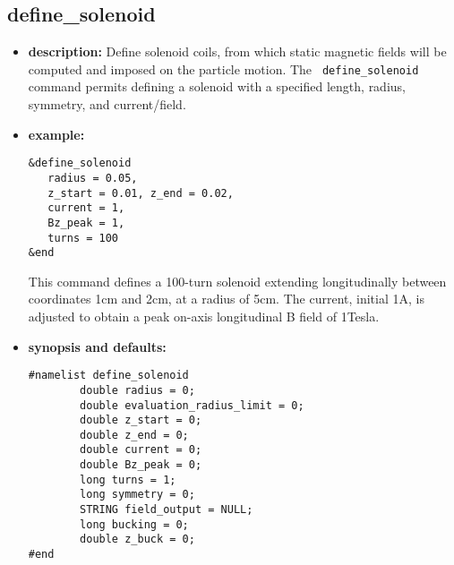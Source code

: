 %
\newpage

\subsection{define\_solenoid}

\begin{itemize}

\item {\bf description:}
Define solenoid coils, from which static magnetic fields will be
computed and imposed on the particle motion.  The {\tt
define\_solenoid} command permits defining a solenoid with a specified
length, radius, symmetry, and current/field.

\item {\bf example:} 
\begin{verbatim}
&define_solenoid
   radius = 0.05, 
   z_start = 0.01, z_end = 0.02,
   current = 1,
   Bz_peak = 1,
   turns = 100
&end
\end{verbatim}
This command defines a 100-turn solenoid extending longitudinally
between coordinates 1cm and 2cm, at a radius of 5cm.  The current,
initial 1A, is adjusted to obtain a peak on-axis longitudinal B field
of 1Tesla.

\item {\bf synopsis and defaults:} 
\begin{verbatim}
#namelist define_solenoid
        double radius = 0;
        double evaluation_radius_limit = 0;
        double z_start = 0;
        double z_end = 0;
        double current = 0;
        double Bz_peak = 0;
        long turns = 1;
        long symmetry = 0;
        STRING field_output = NULL;
        long bucking = 0;
        double z_buck = 0;
#end
\end{verbatim}


\end{itemize}
